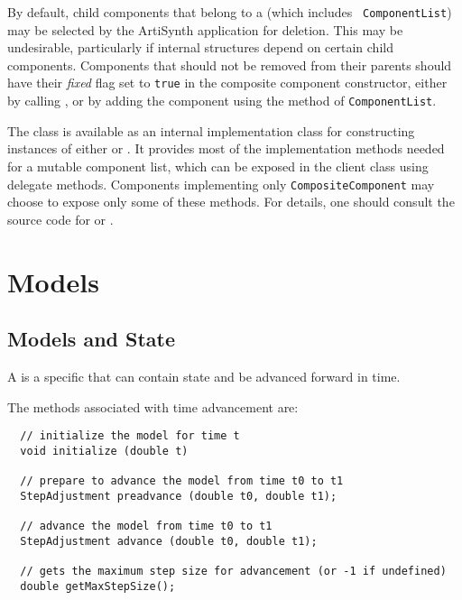 \documentclass{article}
\begin{document}
\begin{sideblock}
By default, child components that belong to a
 (which includes {\tt
ComponentList}) may be selected by the ArtiSynth application for deletion.
This may be undesirable, particularly if internal structures
depend on certain child components.
Components that should not
be removed from their parents should
have their {\it fixed} flag set to {\tt true} in
the composite component constructor, either by calling
,
or by adding the component using the 
 method of {\tt ComponentList}.
\end{sideblock}

The class  is available as an internal
implementation class for constructing instances of either
 or
.  It provides most of the
implementation methods needed for a mutable component list, which can
be exposed in the client class using delegate methods.  Components
implementing only {\tt CompositeComponent} may choose to expose only
some of these methods. For details, one should consult the source code
for  or .


\section{Models}
\label{Models}

\subsection{Models and State}
\label{ModelsAndStateSec}

A  is a specific  that can
contain state and be advanced forward in time.

The methods associated with time advancement are:
\begin{lstlisting}
  // initialize the model for time t
  void initialize (double t)

  // prepare to advance the model from time t0 to t1
  StepAdjustment preadvance (double t0, double t1);

  // advance the model from time t0 to t1
  StepAdjustment advance (double t0, double t1);

  // gets the maximum step size for advancement (or -1 if undefined)
  double getMaxStepSize();
\end{lstlisting}
\end{document}
